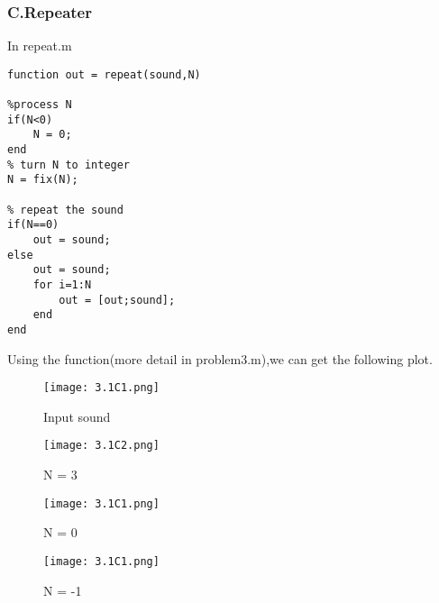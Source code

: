 \documentclass{article}
\begin{document}
\subsubsection*{C.Repeater}
In repeat.m
\begin{lstlisting}
function out = repeat(sound,N)

%process N
if(N<0)
    N = 0;
end
% turn N to integer
N = fix(N);

% repeat the sound
if(N==0)
    out = sound;
else
    out = sound;
    for i=1:N
        out = [out;sound];
    end
end
\end{lstlisting}
Using the function(more detail in problem3.m),we can get the following plot.
\begin{figure}[h]
    \begin{minipage}{0.45\textwidth}
        \centering
        \texttt{[image: 3.1C1.png]}
        \caption{Input sound}
    \end{minipage}
    \begin{minipage}{0.45\textwidth}
        \centering
        \texttt{[image: 3.1C2.png]}
        \caption{N = 3}
    \end{minipage}
    \quad

    \begin{minipage}{0.45\textwidth}
        \centering
        \texttt{[image: 3.1C1.png]}
        \caption{N = 0}
    \end{minipage}
    \begin{minipage}{0.45\textwidth}
        \centering
        \texttt{[image: 3.1C1.png]}
        \caption{N = -1}
    \end{minipage}
\end{figure}
\end{document}
